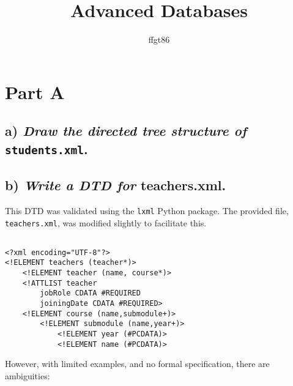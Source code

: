 \documentclass[11pt]{article} %
\title{Advanced Databases}
\author{ffgt86}
\begin{document}
\maketitle

\section*{Part A}

\subsection*{a) \textit{Draw the directed tree structure of} \texttt{students.xml}.}


\subsection*{b) \textit{Write a DTD for} teachers.xml.}

This DTD was validated using the \verb|lxml| Python package. The provided file, \verb|teachers.xml|, was modified slightly to facilitate this.

\begin{verbatim}

<?xml encoding="UTF-8"?>
<!ELEMENT teachers (teacher*)>
    <!ELEMENT teacher (name, course*)>
    <!ATTLIST teacher
        jobRole CDATA #REQUIRED
        joiningDate CDATA #REQUIRED>
    <!ELEMENT course (name,submodule+)>
        <!ELEMENT submodule (name,year+)>
            <!ELEMENT year (#PCDATA)>
            <!ELEMENT name (#PCDATA)>

\end{verbatim}

However, with limited examples, and no formal specification, there are ambiguities:
\end{document}
